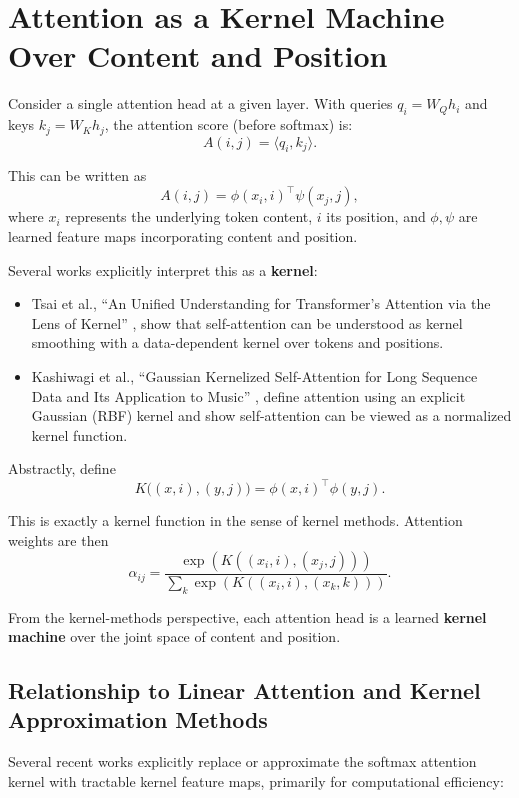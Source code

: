\documentclass[11pt]{article}
\theoremstyle{definition}
\begin{document}
\section{Attention as a Kernel Machine Over Content and Position}
\label{sec:attention-kernel}

Consider a single attention head at a given layer. With queries \(q_i = W_Q h_i\) and keys \(k_j = W_K h_j\), the attention score (before softmax) is:
\[
A(i,j) = \langle q_i, k_j \rangle.
\]

This can be written as
\[
A(i,j) = \phi(x_i, i)^\top \psi(x_j, j),
\]
where \(x_i\) represents the underlying token content, \(i\) its position, and \(\phi, \psi\) are learned feature maps incorporating content and position.

Several works explicitly interpret this as a \textbf{kernel}:

\begin{itemize}
    \item Tsai et al., ``An Unified Understanding for Transformer's Attention via the Lens of Kernel'' \cite{tsai2019transformer}, show that self-attention can be understood as kernel smoothing with a data-dependent kernel over tokens and positions.
    \item Kashiwagi et al., ``Gaussian Kernelized Self-Attention for Long Sequence Data and Its Application to Music'' \cite{kashiwagi2021gaussian}, define attention using an explicit Gaussian (RBF) kernel and show self-attention can be viewed as a normalized kernel function.
\end{itemize}

Abstractly, define
\[
K\big((x,i),(y,j)\big) = \phi(x,i)^\top \phi(y,j).
\]

This is exactly a kernel function in the sense of kernel methods. Attention weights are then
\[
\alpha_{ij} = \frac{\exp(K((x_i,i),(x_j,j)))}{\sum_{k} \exp(K((x_i,i),(x_k,k)))}.
\]

From the kernel-methods perspective, each attention head is a learned \textbf{kernel machine} over the joint space of content and position.

\subsection{Relationship to Linear Attention and Kernel Approximation Methods}

Several recent works explicitly replace or approximate the softmax attention kernel with tractable kernel feature maps, primarily for computational efficiency:
\end{document}
